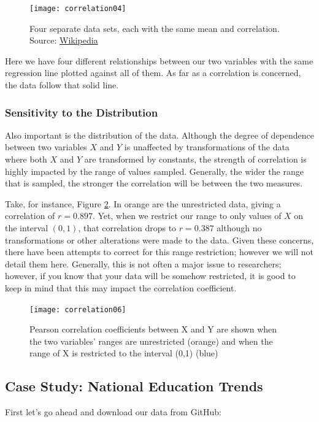 \begin{figure}[h]
\texttt{[image: correlation04]}
\label{fig:correlation04}
\caption{Four separate data sets, each with the same mean and correlation. Source: \href{http://en.wikipedia.org/wiki/Correlation}{Wikipedia}}
\end{figure}

Here we have four different relationships between our two variables with the same regression line plotted against all of them. As far as a correlation is concerned, the data follow that solid line.

\subsubsection{Sensitivity to the Distribution}
Also important is the distribution of the data. Although the degree of dependence between two variables $X$ and $Y$ is unaffected by transformations of the data where both $X$ and $Y$ are transformed by constants, the strength of correlation is highly impacted by the range of values sampled. Generally, the wider the range that is sampled, the stronger the correlation will be between the two measures.

Take, for instance, Figure \ref{fig:correlation06}. In orange are the unrestricted data, giving a correlation of $r=0.897$. Yet, when we restrict our range to only values of $X$ on the interval $(0,1)$, that correlation drops to $r=0.387$ although no transformations or other alterations were made to the data. Given these concerns, there have been attempts to correct for this range restriction; however we will not detail them here. Generally, this is not often a major issue to researchers; however, if you know that your data will be somehow restricted, it is good to keep in mind that this may impact the correlation coefficient.

\begin{figure}[h]
\texttt{[image: correlation06]}
\caption{Pearson correlation coefficients between X and Y are shown when the two variables' ranges are unrestricted (orange) and when the range of X is restricted to the interval (0,1) (blue)}
\label{fig:correlation06}
\end{figure}

\subsection{Case Study: National Education Trends}

First let's go ahead and download our data from GitHub:

